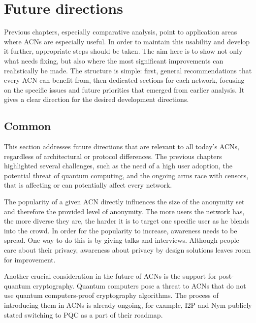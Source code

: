 \chapter{Future directions}
\label{chap:Future}

Previous chapters, especially comparative analysis, point to application areas where ACNs are especially useful. In order to maintain this usability and develop it further, appropriate steps should be taken. The aim here is to show not only what needs fixing, but also where the most significant improvements can realistically be made. The structure is simple: first, general recommendations that every ACN can benefit from, then dedicated sections for each network, focusing on the specific issues and future priorities that emerged from earlier analysis. It gives a clear direction for the desired development directions.

\section{Common}
This section addresses future directions that are relevant to all today's ACNs, regardless of architectural or protocol differences. The previous chapters highlighted several challenges, such as the need of a high user adoption, the potential threat of quantum computing, and the ongoing arms race with censors, that is affecting or can potentially affect every network.

The popularity of a given ACN directly influences the size of the anonymity set and therefore the provided level of anonymity. The more users the network has, the more diverse they are, the harder it is to target one specific user as he blends into the crowd. In order for the popularity to increase, awareness needs to be spread. One way to do this is by giving talks and interviews. Although people care about their privacy, awareness about privacy by design solutions leaves room for improvement.

Another crucial consideration in the future of ACNs is the support for post-quantum cryptography. Quantum computers pose a threat to ACNs that do not use quantum computers-proof cryptography algorithms. The process of introducing them in ACNs is already ongoing, for example, I2P and Nym publicly stated switching to PQC as a part of their roadmap.

